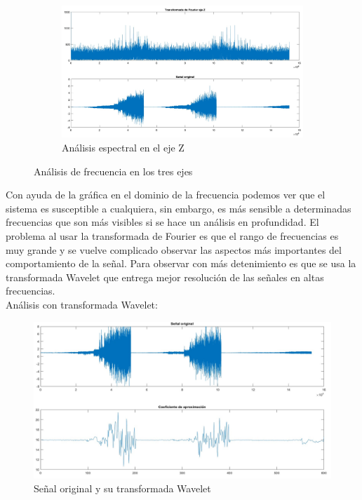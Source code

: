 \documentclass[11pt,a4paper]{article}
\begin{document}
\begin{figure}[h!]
\begin{subfigure}[b]{1\textwidth}
		\centering
		\includegraphics[scale=0.20]{fft_z}
		\caption{Análisis espectral en el eje Z}
		\label{fig:f3}
		\hfill
	\end{subfigure}
	\caption{Análisis de frecuencia en los tres ejes}
\end{figure}

Con ayuda de la gráfica en el dominio de la frecuencia podemos ver que el sistema es susceptible a cualquiera, sin embargo, es más sensible a determinadas frecuencias que son más visibles si se hace un análisis en profundidad. El problema al usar la transformada de Fourier es que el rango de frecuencias es muy grande y se vuelve complicado observar las aspectos más importantes del comportamiento de la señal. Para observar con más detenimiento es que se usa la transformada Wavelet que entrega mejor resolución de las señales en altas frecuencias.
\\
Análisis con transformada Wavelet:
\begin{figure}[h!]
	\centering
	\includegraphics[scale=0.45]{original_y_wavelet_x}
	\caption{Señal original y su transformada Wavelet}
\end{figure}
\end{document}
